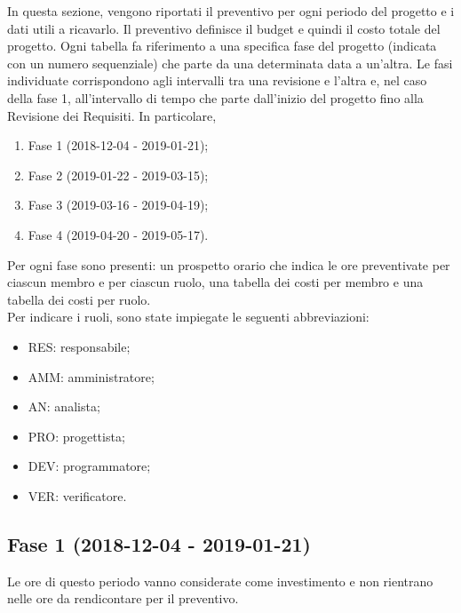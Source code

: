 In questa sezione, vengono riportati il preventivo per ogni periodo del progetto e i dati utili a ricavarlo. Il preventivo definisce il budget e quindi il costo totale del progetto. Ogni tabella fa riferimento a una specifica fase del progetto (indicata con un numero sequenziale) che parte da una determinata data a un'altra.
Le fasi individuate corrispondono agli intervalli tra una revisione e l'altra e, nel caso della fase 1, all'intervallo di tempo che parte dall'inizio del progetto fino alla Revisione dei Requisiti. In particolare,
\begin{enumerate}
	\item Fase 1 (2018-12-04 - 2019-01-21); 
	\item Fase 2 (2019-01-22 - 2019-03-15);
	\item Fase 3 (2019-03-16 - 2019-04-19);
	\item Fase 4 (2019-04-20 - 2019-05-17).
\end{enumerate}
Per ogni fase sono presenti: un prospetto orario che indica le ore preventivate per ciascun membro e per ciascun ruolo, una tabella dei costi per membro e una tabella dei costi per ruolo.\\
Per indicare i ruoli, sono state impiegate le seguenti abbreviazioni:
\begin{itemize}
	\item RES: responsabile;
	\item AMM: amministratore;
	\item AN: analista;
	\item PRO: progettista;
	\item DEV: programmatore;
	\item VER: verificatore.
\end{itemize}

\subsection{Fase 1 (2018-12-04 - 2019-01-21)}
	Le ore di questo periodo vanno considerate come investimento e non rientrano nelle ore da rendicontare per il preventivo.
